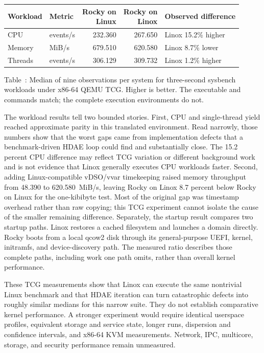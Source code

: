 \documentclass[11pt]{article}
\begin{document}
\begin{center}
\label{tab:sysbench-checkpoint}
\centering
\small
\begin{tabular}{@{}llrrl@{}}
\toprule
Workload & Metric & \shortstack{Rocky on\\Linux} & \shortstack{Rocky on\\Linox} & Observed difference \\
\midrule
CPU & events/s & 232.360 & 267.650 & Linox 15.2\% higher \\
Memory & MiB/s & 679.510 & 620.580 & Linox 8.7\% lower \\
Threads & events/s & 306.129 & 309.732 & Linox 1.2\% higher \\
\bottomrule
\end{tabular}
\par\medskip
Table~\thetable: Median of nine observations per system for three-second
sysbench workloads under x86-64 QEMU TCG. Higher is better. The executable and
commands match; the complete execution environments do not.
\end{center}
\medskip

The workload results tell two bounded stories. First, CPU and single-thread
yield reached approximate parity in this translated environment. Read narrowly,
those numbers show that the worst gaps came from implementation defects that a
benchmark-driven HDAE loop could find and substantially close. The 15.2 percent
CPU difference may reflect TCG variation or different background work and is
not evidence that Linox generally executes CPU workloads faster. Second, adding Linux-compatible
vDSO/vvar timekeeping raised memory throughput from 48.390 to 620.580~MiB/s,
leaving Rocky on Linox 8.7 percent below Rocky on Linux for the
one-kibibyte test. Most of the original gap was timestamp overhead rather than
raw copying; this TCG experiment cannot isolate the cause of the smaller
remaining difference. Separately, the startup result compares two startup paths.
Linox restores a cached filesystem and launches a domain directly. Rocky boots
from a local qcow2 disk through its general-purpose UEFI, kernel, initramfs,
and device-discovery path. The measured ratio describes those complete paths,
including work one path omits, rather than overall kernel performance.

These TCG measurements show that Linox can execute the same nontrivial Linux
benchmark and that HDAE iteration can turn catastrophic defects into roughly
similar medians for this narrow suite. They do not establish comparative kernel
performance. A stronger experiment would require identical userspace profiles,
equivalent storage and service state, longer runs, dispersion and confidence
intervals, and x86-64 KVM measurements. Network, IPC, multicore, storage, and
security performance remain unmeasured.
\end{document}
